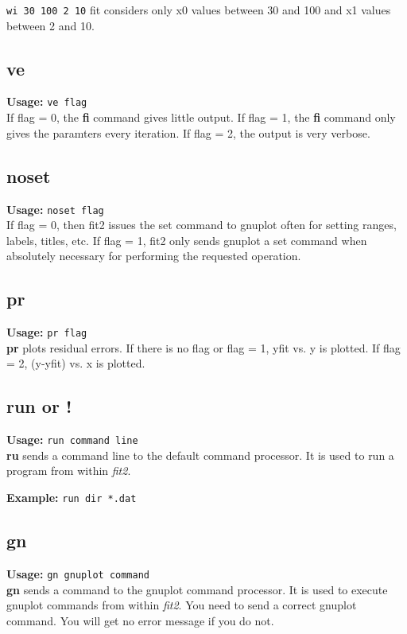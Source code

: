  {\tt wi 30 100 2 10} fit considers only x0 values between 30 
 and 100 and x1 values between 2 and 10.

\subsection{ve}     {\bf Usage: } {\tt  ve flag} \\

        If flag = 0, the {\bf fi} command gives little output. If
 flag = 1, the {\bf fi} command only gives the paramters every
 iteration.  If flag = 2, the output is very verbose.

\subsection{noset}     {\bf Usage: } {\tt  noset flag} \\

If flag = 0, then fit2 issues the set command to
gnuplot often for setting ranges, labels, titles, etc.
If flag = 1, fit2 only sends gnuplot a set command when
absolutely necessary for performing the requested operation.


\subsection{pr}      {\bf Usage: } {\tt  pr flag} \\

        {\bf pr} plots residual errors.  If there is no flag or
 flag = 1, yfit vs. y is plotted.  If flag = 2, (y-yfit) vs.
 x is plotted.

\subsection{run or !}     {\bf Usage: } {\tt  run command line} \\

        {\bf ru} sends a command line to the default command
 processor. It is used to run a program from within {\em fit2}.

        {\bf Example: } {\tt  run dir *.dat}

\subsection{gn}      {\bf Usage: } {\tt  gn gnuplot command} \\

        {\bf gn} sends a command to the gnuplot command processor.
 It is used to execute gnuplot commands from within {\em fit2}.
 You need to send a correct gnuplot command.  You will get
 no error message if you do not.

